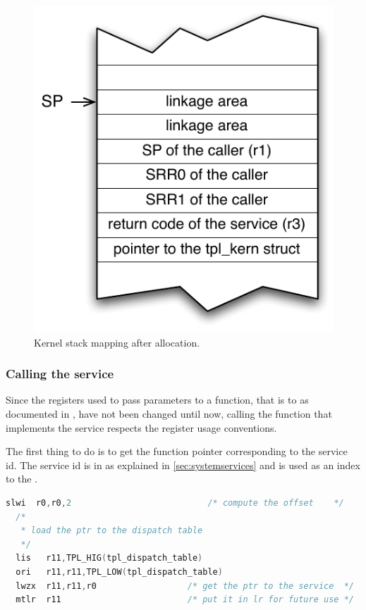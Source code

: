 \begin{figure}[htbp] %
\begin{minipage}{0.5\textwidth}
    \centering
  \includegraphics[scale=.6]{pictures/KStackMapping} 
\end{minipage}
\begin{minipage}{0.5\textwidth}
  \caption{Kernel stack mapping after allocation.}\label{fig:kernelstackmapping}
\end{minipage}
\end{figure}

\subsubsection{Calling the service}

Since the registers used to pass parameters to a function, that is  to  as documented in \cite{PPCeabi}, have not been changed until now, calling the function that implements the service respects the register usage conventions.

The first thing to do is to get the function pointer corresponding to the service id. The service id is in  as explained in \ref{sec:systemservices} and is used as an index to the .

\begin{lstlisting}[language=C]
  slwi  r0,r0,2                           /* compute the offset    */
  /*
   * load the ptr to the dispatch table
   */
  lis   r11,TPL_HIG(tpl_dispatch_table)     
  ori   r11,r11,TPL_LOW(tpl_dispatch_table)
  lwzx  r11,r11,r0                  /* get the ptr to the service  */
  mtlr  r11                         /* put it in lr for future use */
\end{lstlisting}

